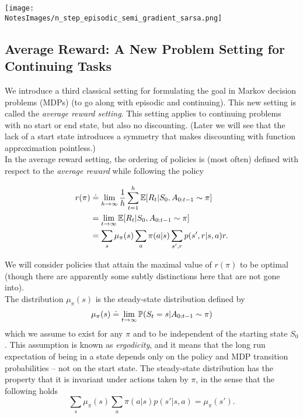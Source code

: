 \texttt{[image: \\NotesImages/n\_step\_episodic\_semi\_gradient\_sarsa.png]}\\


\subsection{Average Reward: A New Problem Setting for Continuing Tasks}
We introduce a third classical setting for formulating the goal in Markov decision problems (MDPs) (to go along with episodic and continuing). This new setting is called the \emph{average reward setting}. This setting applies to continuing problems with no start or end state, but also no discounting. (Later we will see that the lack of a start state introduces a symmetry that makes discounting with function approximation pointless.)\\

In the average reward setting, the ordering of policies is (most often) defined with respect to the \emph{average reward}  while following the policy

\begin{align}
    r(\pi) &\doteq \lim_{h\to\infty} \frac1h \sum_{t=1}^{h} \E{}[R_{t} \vert{} S_0, A_{0:t-1} \sim \pi]\\
             &= \lim_{t\to\infty} \E{}[R_{t} \vert{} S_0, A_{0:t-1} \sim \pi] \\
             &= \sum_s \mu_\pi(s) \sum_a \pi(a \vert{} s) \sum_{s', r} p(s', r \vert{} s, a) r.
\end{align}

We will consider policies that attain the maximal value of $r(\pi)$ to be optimal (though there are apparently some subtly distinctions here that are not gone into).\\

The distribution $\mu_\pi(s)$ is the steady-state distribution defined by
\begin{equation}
    \mu_\pi(s) \doteq \lim_{t\to \infty} \P{} (S_t = s \vert{} A_{0:t-1} \sim \pi)
\end{equation}
which we assume to exist for any $\pi$ and to be independent of the starting state $S_0$. This assumption is known as \emph{ergodicity}, and it means that the long run expectation of being in a state depends only on the policy and MDP transition probabilities -- not on the start state. The steady-state distribution has the property that it is invariant under actions taken by $\pi$, in the sense that the following holds
\[
    \sum_s \mu_\pi(s) \sum_a \pi(a \vert{} s) p(s' \vert{} s, a) = \mu_\pi(s').
\]\\

